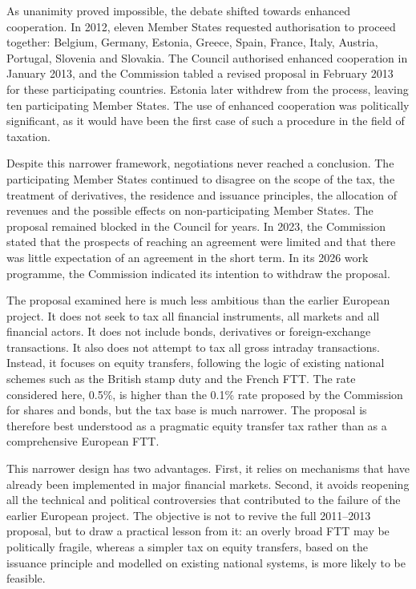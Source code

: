 \documentclass[../../main]{subfiles}
\begin{document}
As unanimity proved impossible, the debate shifted towards enhanced cooperation. In 2012, eleven Member States requested authorisation to proceed together: Belgium, Germany, Estonia, Greece, Spain, France, Italy, Austria, Portugal, Slovenia and Slovakia. The Council authorised enhanced cooperation in January 2013, and the Commission tabled a revised proposal in February 2013 for these participating countries. Estonia later withdrew from the process, leaving ten participating Member States. The use of enhanced cooperation was politically significant, as it would have been the first case of such a procedure in the field of taxation.

Despite this narrower framework, negotiations never reached a conclusion. The participating Member States continued to disagree on the scope of the tax, the treatment of derivatives, the residence and issuance principles, the allocation of revenues and the possible effects on non-participating Member States. The proposal remained blocked in the Council for years. In 2023, the Commission stated that the prospects of reaching an agreement were limited and that there was little expectation of an agreement in the short term. In its 2026 work programme, the Commission indicated its intention to withdraw the proposal.

The proposal examined here is much less ambitious than the earlier European project. It does not seek to tax all financial instruments, all markets and all financial actors. It does not include bonds, derivatives or foreign-exchange transactions. It also does not attempt to tax all gross intraday transactions. Instead, it focuses on equity transfers, following the logic of existing national schemes such as the British stamp duty and the French FTT. The rate considered here, 0.5\%, is higher than the 0.1\% rate proposed by the Commission for shares and bonds, but the tax base is much narrower. The proposal is therefore best understood as a pragmatic equity transfer tax rather than as a comprehensive European FTT.

This narrower design has two advantages. First, it relies on mechanisms that have already been implemented in major financial markets. Second, it avoids reopening all the technical and political controversies that contributed to the failure of the earlier European project. The objective is not to revive the full 2011--2013 proposal, but to draw a practical lesson from it: an overly broad FTT may be politically fragile, whereas a simpler tax on equity transfers, based on the issuance principle and modelled on existing national systems, is more likely to be feasible.
\end{document}
